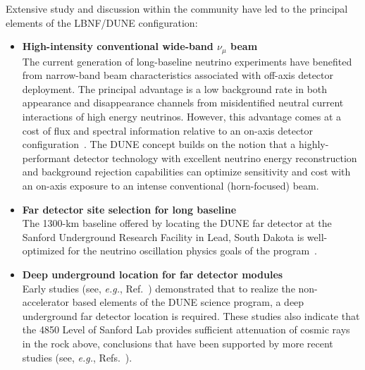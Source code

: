 Extensive study and discussion within the community
have led to the principal elements of the LBNF/DUNE
configuration:
\begin{itemize}
  \item {\bf\boldmath High-intensity conventional wide-band
  $\nu_\mu$ beam}\\
	The current generation of long-baseline neutrino experiments
	have benefited from narrow-band beam characteristics 
	associated with off-axis detector deployment. The principal 
	advantage is a low background rate in both \nue appearance 
	and \numu disappearance channels from misidentified neutral 
	current interactions of high energy neutrinos.  
	However, this advantage comes at a cost of flux and 
	spectral information relative to an on-axis detector 
    configuration~\cite{Adams:2013qkq,Agarwalla:2014tca}.
    The DUNE concept
    builds on the notion that a highly-performant detector
    technology with excellent neutrino energy reconstruction
    and background rejection capabilities can
    optimize sensitivity and cost with an on-axis exposure to
    an intense conventional (horn-focused) beam.

  \item {\bf Far detector site selection for long baseline}\\
    The 1300-km baseline offered by locating the DUNE far detector
    at the Sanford Underground Research Facility in Lead, 
    South Dakota is well-optimized for the neutrino oscillation 
    physics goals of the program~\cite{Bass:2013vcg}.

  \item {\bf Deep underground location for far detector modules}\\
    Early studies (see, {\sl e.g.}, Ref.~\cite{homestake:depth}) 
    demonstrated that to realize the non-accelerator based elements
    of the DUNE science program, a deep underground far detector
    location is required.  These studies also indicate that the 
    4850 Level of Sanford Lab provides sufficient attenuation of 
    cosmic rays in the rock above, conclusions that have been 
    supported by more recent studies (see,
    {\sl e.g.}, Refs.~\cite{bib:docdb3384,bib:docdb1752}).


\end{itemize}
